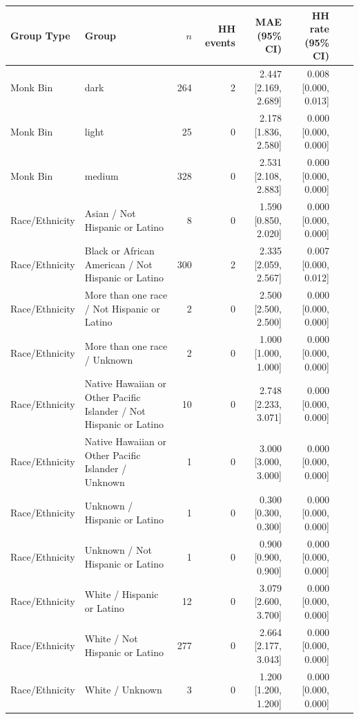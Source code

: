 \begin{tabular}{llrrrrrr}
\toprule
Group Type & Group & $n$ & HH events & MAE (95\% CI) & HH rate (95\% CI) \\
\midrule
Monk Bin & dark & 264 & 2 & 2.447 [2.169, 2.689] & 0.008 [0.000, 0.013] \\
Monk Bin & light & 25 & 0 & 2.178 [1.836, 2.580] & 0.000 [0.000, 0.000] \\
Monk Bin & medium & 328 & 0 & 2.531 [2.108, 2.883] & 0.000 [0.000, 0.000] \\
Race/Ethnicity & Asian / Not Hispanic or Latino & 8 & 0 & 1.590 [0.850, 2.020] & 0.000 [0.000, 0.000] \\
Race/Ethnicity & Black or African American / Not Hispanic or Latino & 300 & 2 & 2.335 [2.059, 2.567] & 0.007 [0.000, 0.012] \\
Race/Ethnicity & More than one race / Not Hispanic or Latino & 2 & 0 & 2.500 [2.500, 2.500] & 0.000 [0.000, 0.000] \\
Race/Ethnicity & More than one race / Unknown & 2 & 0 & 1.000 [1.000, 1.000] & 0.000 [0.000, 0.000] \\
Race/Ethnicity & Native Hawaiian or Other Pacific Islander / Not Hispanic or Latino & 10 & 0 & 2.748 [2.233, 3.071] & 0.000 [0.000, 0.000] \\
Race/Ethnicity & Native Hawaiian or Other Pacific Islander / Unknown & 1 & 0 & 3.000 [3.000, 3.000] & 0.000 [0.000, 0.000] \\
Race/Ethnicity & Unknown / Hispanic or Latino & 1 & 0 & 0.300 [0.300, 0.300] & 0.000 [0.000, 0.000] \\
Race/Ethnicity & Unknown / Not Hispanic or Latino & 1 & 0 & 0.900 [0.900, 0.900] & 0.000 [0.000, 0.000] \\
Race/Ethnicity & White / Hispanic or Latino & 12 & 0 & 3.079 [2.600, 3.700] & 0.000 [0.000, 0.000] \\
Race/Ethnicity & White / Not Hispanic or Latino & 277 & 0 & 2.664 [2.177, 3.043] & 0.000 [0.000, 0.000] \\
Race/Ethnicity & White / Unknown & 3 & 0 & 1.200 [1.200, 1.200] & 0.000 [0.000, 0.000] \\
\bottomrule
\end{tabular}
